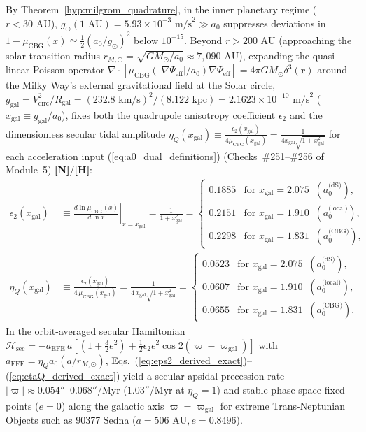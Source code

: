 \documentclass[11pt,a4paper]{article}
\newcommand{\catH}{\textbf{\textcolor{orange!85!black}{[H]}}}
\newcommand{\catN}{\textbf{\textcolor{teal!75!black}{[N]}}}
\theoremstyle{definition}
\theoremstyle{remark}
\begin{document}
By Theorem~\ref{hyp:milgrom_quadrature}, in the inner planetary regime ($r < 30\text{ AU}$), $g_{\odot}(1\text{ AU}) = 5.93 \times 10^{-3}\text{ m/s}^2 \gg a_0$ suppresses deviations in $1 - \mu_{\text{CBG}}(x) \simeq \frac{1}{2}(a_0/g_{\odot})^2$ below $10^{-15}$. Beyond $r > 200\text{ AU}$ (approaching the solar transition radius $r_{M,\odot} = \sqrt{GM_{\odot}/a_0} \approx 7{,}090\text{ AU}$), expanding the quasi-linear Poisson operator $\nabla\cdot[\mu_{\text{CBG}}(|\nabla\Psi_{\text{eff}}|/a_0)\nabla\Psi_{\text{eff}}] = 4\pi G M_{\odot}\delta^3(\mathbf{r})$ around the Milky Way's external gravitational field at the Solar circle, $g_{\text{gal}} = V_{\text{circ}}^2/R_{\text{gal}} = (232.8\text{ km/s})^2/(8.122\text{ kpc}) = 2.1623 \times 10^{-10}\text{ m/s}^2$ ($x_{\text{gal}} \equiv g_{\text{gal}}/a_0$), fixes both the quadrupole anisotropy coefficient $\epsilon_2$ and the dimensionless secular tidal amplitude $\eta_Q(x_{\text{gal}}) \equiv \frac{\epsilon_2(x_{\text{gal}})}{4\mu_{\text{CBG}}(x_{\text{gal}})} = \frac{1}{4 x_{\text{gal}}\sqrt{1 + x_{\text{gal}}^2}}$ for each acceleration input (\ref{eq:a0_dual_definitions}) (Checks~\#251--\#256 of Module~5) \catN/\catH:
\begin{align}
  \epsilon_2(x_{\text{gal}}) &\equiv \left.\frac{d\ln\mu_{\text{CBG}}(x)}{d\ln x}\right|_{x = x_{\text{gal}}} = \frac{1}{1 + x_{\text{gal}}^2} = \begin{cases}
    \mathbf{0.1885} & \text{for } x_{\text{gal}} = 2.075 \;\;(a_0^{\text{(dS)}}), \\[2pt]
    \mathbf{0.2151} & \text{for } x_{\text{gal}} = 1.910 \;\;(a_0^{\text{(local)}}), \\[2pt]
    \mathbf{0.2298} & \text{for } x_{\text{gal}} = 1.831 \;\;(a_0^{\text{(CBG)}}),
  \end{cases} \label{eq:eps2_derived_exact} \\[5pt]
  \eta_Q(x_{\text{gal}}) &\equiv \frac{\epsilon_2(x_{\text{gal}})}{4\,\mu_{\text{CBG}}(x_{\text{gal}})} = \frac{1}{4\,x_{\text{gal}}\sqrt{1 + x_{\text{gal}}^2}} = \begin{cases}
    \mathbf{0.0523} & \text{for } x_{\text{gal}} = 2.075 \;\;(a_0^{\text{(dS)}}), \\[2pt]
    \mathbf{0.0607} & \text{for } x_{\text{gal}} = 1.910 \;\;(a_0^{\text{(local)}}), \\[2pt]
    \mathbf{0.0655} & \text{for } x_{\text{gal}} = 1.831 \;\;(a_0^{\text{(CBG)}}).
  \end{cases} \label{eq:etaQ_derived_exact}
\end{align}
In the orbit-averaged secular Hamiltonian $\mathcal{H}_{\text{sec}} = -a_{\text{EFE}}\,a[(1 + \frac{3}{2}e^2) + \frac{1}{2}\epsilon_2 e^2\cos 2(\varpi - \varpi_{\text{gal}})]$ with $a_{\text{EFE}} = \eta_Q a_0(a/r_{M,\odot})$, Eqs.~(\ref{eq:eps2_derived_exact})--(\ref{eq:etaQ_derived_exact}) yield a secular apsidal precession rate $|\dot{\varpi}| \approx 0.054''\text{--}0.068''/\text{Myr}$ ($1.03''/\text{Myr}$ at $\eta_Q = 1$) and stable phase-space fixed points ($\dot{e} = 0$) along the galactic axis $\varpi = \varpi_{\text{gal}}$ for extreme Trans-Neptunian Objects such as 90377 Sedna ($a = 506\text{ AU}, e = 0.8496$).
\end{document}
